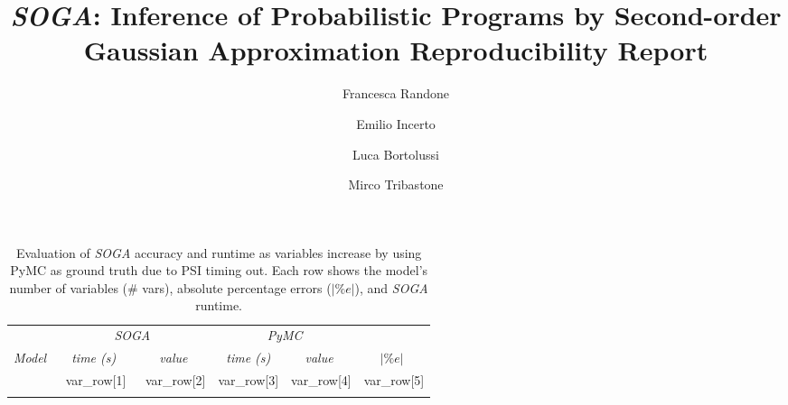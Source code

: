 \documentclass[a4paper]{llncs}
\newcommand{\soga}{\textsl{SOGA}}
\begin{document}
\mainmatter

\title{\soga: Inference of Probabilistic Programs by Second-order Gaussian Approximation Reproducibility Report}


\author{Francesca Randone  \and Emilio Incerto  \and Luca Bortolussi  \and Mirco Tribastone}

\allowdisplaybreaks[0]

\maketitle
\setcounter{table}{1}
\begin{table}[t]
    \centering
    \caption{Evaluation of \soga{} accuracy and runtime as variables increase by using PyMC as ground truth due to PSI timing out. Each row shows the model's number of variables (\# vars), absolute percentage errors ($|\%e|$), and \soga{} runtime.} 
     \begin{tabular}{cccccc}
     \toprule 
        &\multicolumn{2}{c}{\emph{SOGA}}&\multicolumn{2}{c}{\emph{PyMC}}\\
        \cmidrule(l){2-3}  \cmidrule(l){4-5}
        \emph{Model}&
    \ \ \emph{time (s)}  \ \ &  \ \  \emph{value} \ \ & \emph{time (s)} 
    & \ \  \emph{value} \ \  &\ \  $|\%e|$ \ \  \\
    \midrule{%
        $\textsl{{ '{' }}{{var_row[0]}}{{ '}' }}_{{ '{' }}{{var_row[-1]|int}}{{ '}' }}$ & {{var_row[1]}} & {{var_row[2]}} & {{var_row[3]}} & {{var_row[4]}} &{{var_row[5]}} \\{%
    \bottomrule
    \end{tabular}
    \label{tab:sensVar}
\end{table}
\end{document}
